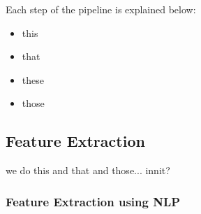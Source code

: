 \documentclass[10pt,letterpaper,draft]{article}
\begin{document}
Each step of the pipeline is explained below:
\begin{itemize}
\item this
\item that
\item these
\item those
\end{itemize}







\subsection{Feature Extraction}
we do this and that and those... innit?


\subsubsection{Feature Extraction using NLP}
\end{document}
